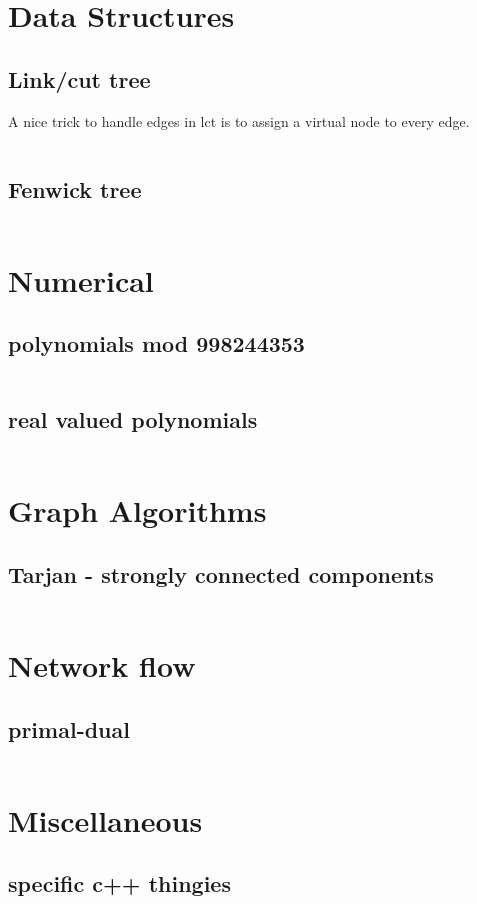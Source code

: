 \documentclass[portrait, 8pt, a4paper, oneside, landscape]{extarticle}
\begin{document}
\thispagestyle{empty}
\begin{figure}[h!]

\end{figure}
\newpage

\twocolumn
\maketitlepage
\newpage

\section{Data Structures}
\subsection{Link/cut tree}
A nice trick to handle edges in lct is to assign a virtual node to every edge.
\inputminted{cpp}{src/lct.cpp}
\subsection{Fenwick tree}
\inputminted{cpp}{src/fenwick2d.cpp}

\section{Numerical}
\subsection{polynomials mod 998244353}
\inputminted{cpp}{src/poly_mod.cpp}

\subsection{real valued polynomials}
\inputminted{cpp}{src/poly.cpp}

\section{Graph Algorithms}

\subsection{Tarjan - strongly connected components}
\inputminted{cpp}{src/scc.cpp}

\section{Network flow}
\subsection{primal-dual}
\inputminted{cpp}{src/primal_dual.cpp}

\section{Miscellaneous}
\subsection{specific c++ thingies}
\inputminted{cpp}{src/cpp_utils.cpp}
\end{document}
